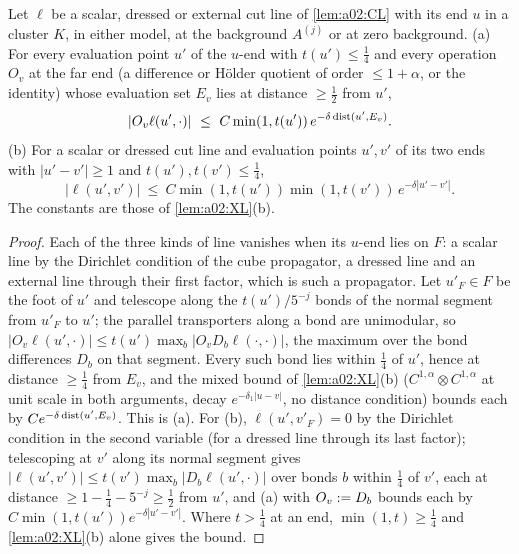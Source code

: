 \begin{lemma}\label{lem:k02:face}
Let $\ell$ be a scalar, dressed or external cut line of \cref{lem:a02:CL} with its end $u$ in a cluster $K$, in either model, at the background $A^{(j)}$ or at zero background. \textup{(a)} For every evaluation point $u'$ of the $u$-end with $t(u')\le\frac14$ and every operation $O_v$ at the far end (a difference or H\"older quotient of order $\le1+\alpha$, or the identity) whose evaluation set $E_v$ lies at distance $\ge\frac12$ from $u'$,
\[
|O_v\ell(u',\cdot)|\ \le\ C\min(1,t(u'))\,e^{-\delta\dist(u',E_v)} .
\]
\textup{(b)} For a scalar or dressed cut line and evaluation points $u',v'$ of its two ends with $|u'-v'|\ge1$ and $t(u'),t(v')\le\frac14$,
\[
|\ell(u',v')|\ \le\ C\min(1,t(u'))\min(1,t(v'))\,e^{-\delta|u'-v'|} .
\]
The constants are those of \cref{lem:a02:XL}(b).
\end{lemma}
\begin{proof}
Each of the three kinds of line vanishes when its $u$-end lies on $F$: a scalar line by the Dirichlet condition of the cube propagator, a dressed line and an external line through their first factor, which is such a propagator. Let $u'_F\in F$ be the foot of $u'$ and telescope along the $t(u')/5^{-j}$ bonds of the normal segment from $u'_F$ to $u'$; the parallel transporters along a bond are unimodular, so $|O_v\ell(u',\cdot)|\le t(u')\max_b|O_vD_b\ell(\cdot,\cdot)|$, the maximum over the bond differences $D_b$ on that segment. Every such bond lies within $\frac14$ of $u'$, hence at distance $\ge\frac14$ from $E_v$, and the mixed bound of \cref{lem:a02:XL}(b) ($C^{1,\alpha}\otimes C^{1,\alpha}$ at unit scale in both arguments, decay $e^{-\delta_1|u-v|}$, no distance condition) bounds each by $Ce^{-\delta\operatorname{dist}(u',E_v)}$. This is (a). For (b), $\ell(u',v'_F)=0$ by the Dirichlet condition in the second variable (for a dressed line through its last factor); telescoping at $v'$ along its normal segment gives $|\ell(u',v')|\le t(v')\max_b|D_b\ell(u',\cdot)|$ over bonds $b$ within $\frac14$ of $v'$, each at distance $\ge1-\frac14-5^{-j}\ge\frac12$ from $u'$, and (a) with $O_v:= D_b$ bounds each by $C\min(1,t(u'))e^{-\delta|u'-v'|}$. Where $t>\frac14$ at an end, $\min(1,t)\ge\frac14$ and \cref{lem:a02:XL}(b) alone gives the bound.
\end{proof}

